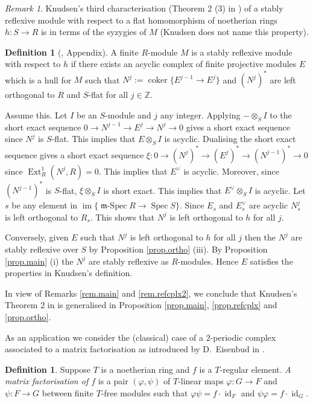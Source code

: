 \documentclass[a4paper,10pt]{amsart}
\theoremstyle{plain}
\theoremstyle{definition}
\newtheorem{defn}[xx]{Definition}%
\newtheorem*{defn*}{Definition}%
\theoremstyle{remark}
\newtheorem{rem}[xx]{Remark}
\numberwithin{equation}{xx}
\DeclareMathOperator{\coker}{coker}
\DeclareMathOperator{\Ext}{Ext}
\DeclareMathOperator{\id}{id}
\DeclareMathOperator{\im}{im}
\DeclareMathOperator{\mSpec}{\fr{m}-Spec}
\DeclareMathOperator{\Spec}{Spec}
\newcommand{\co}{\colon}
\newcommand{\ra}{\rightarrow}
\newcommand{\ot}{{\otimes}}
\renewcommand{\phi}{\varphi}
\newcommand{\BB}[1]{\mathbb{{#1}}}
\newcommand{\fr}[1]{\mathfrak{{#1}}}
\newcommand{\xt}[4]{{\Ext} _{#2}^{#1}({#3},{#4})}
\begin{document}
\begin{rem}\label{rem.syzref}
Knudsen's third characterisation (Theorem 2 (3) in \cite[Appendix]{knu:83a}) of a stably reflexive module with respect to a flat homomorphism of noetherian rings \(h\co S\ra R\) is in terms of the syzygies of \(M\) (Knudsen does not name this property).
\begin{defn*}[{\cite{knu:83a}, Appendix}]
A finite \(R\)-module \(M\) is a stably reflexive module with respect to \(h\) if there exists an acyclic complex of finite projective modules \(E\) which is a hull for \(M\) such that \(N^{j}:=\coker\{E^{j-1}\ra E^{j}\}\) and \((N^{j})^{*}\) are left orthogonal to \(R\) and \(S\)-flat for all \(j\in\BB{Z}\)\textup{.}
\end{defn*}
Assume this. Let \(I\) be an \(S\)-module and \(j\) any integer. Applying \(-\ot_{S}I\) to the short exact sequence \(0\ra N^{j-1}\ra E^{j}\ra N^{j}\ra 0\) gives a short exact sequence since \(N^{j}\) is \(S\)-flat. This implies that \(E\ot_{S}I\) is acyclic. Dualising the short exact sequence gives a short exact sequence \(\xi\co0\ra (N^{j})^{*}\ra (E^{j})^{*}\ra (N^{j-1})^{*}\ra 0\) since \(\xt{1}{R}{N^{j}}{R}=0\). This implies that \(E^{\vee}\) is acyclic. Moreover, since \((N^{j-1})^{*}\) is \(S\)-flat, \(\xi\ot_{S}I\) is short exact. This implies that \(E^{\vee}\ot_{S}I\) is acyclic. Let \(s\) be any element in \(\im\{\mSpec R\ra\Spec S\}\). Since \(E_{s}\) and \(E_{s}^{\vee}\) are acyclic \(N^{j}_{s}\) is left orthogonal to \(R_{s}\). This shows that \(N^{j}\) is left orthogonal to \(h\) for all \(j\).

Conversely, given \(E\) such that \(N^{j}\) is left orthogonal to \(h\) for all \(j\) then the \(N^{j}\) are stably reflexive over \(S\) by Proposition \ref{prop.ortho} (iii). By Proposition \ref{prop.main} (i) the \(N^{j}\) are stably reflexive as \(R\)-modules. Hence \(E\) satisfies the properties in Knudsen's definition.

In view of Remarks \ref{rem.main} and \ref{rem.refcplx2}, we conclude that Knudsen's Theorem 2 in \cite[Appendix]{knu:83a} is generalised in Proposition \ref{prop.main}, \ref{prop.refcplx} and \ref{prop.ortho}.
\end{rem}
As an application we consider the (classical) case of a \(2\)-periodic complex associated to a matrix factorisation as introduced by D.\ Eisenbud in \cite{eis:80}.
\begin{defn}\label{def.mf}
Suppose \(T\) is a noetherian ring and \(f\) is a \(T\)-regular element. \emph{A matrix factorisation of \(f\)} is a pair \((\phi,\psi)\) of \(T\)-linear maps \(\phi\co G\ra F\) and \(\psi\co F\ra G\) between finite \(T\)-free modules such that \(\phi\psi=f{\cdot}\id_{F}\) and \(\psi\phi=f{\cdot}\id_{G}\).
\end{defn}
\end{document}
